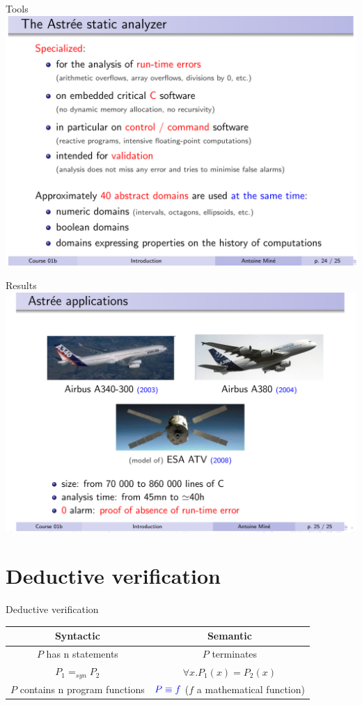 \begin{frame}{Tools}
\centering \includegraphics[scale=0.45]{content/images/static-analysis/astree.png}
\end{frame}


\begin{frame}{Results}
\centering \includegraphics[scale=0.45]{content/images/static-analysis/astreresult.png}
\end{frame}

\section{Deductive verification}


\begin{frame}{Deductive verification}
\footnotesize
\begin{tabular}{|c|c|}
	\hline
	Syntactic & Semantic\\
	\hline 
	$P$ has n statements &  $P$ terminates\\
	
	$P_1 =_{syn} P_2$  & $\forall x.P_1(x) = P_2(x)$\\
	$P$ contains n program functions &  $\color{blue}{P \equiv  f}$ ($f$ a mathematical function)\\
	\hline
\end{tabular}
\end{frame}

